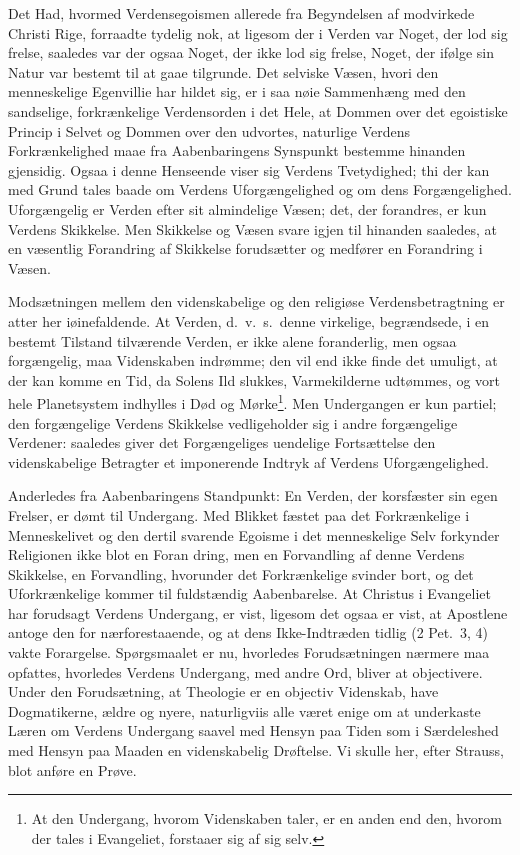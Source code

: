 \documentclass[12pt]{book}
\begin{document}
Det Had, hvormed Verdensegoismen allerede fra Begyndelsen af
modvirkede Christi Rige, forraadte tydelig nok, at ligesom der i
Verden var Noget, der lod sig frelse, saaledes var der ogsaa Noget,
der ikke lod sig frelse, Noget, der ifølge sin Natur var bestemt til
at
gaae tilgrunde. Det selviske Væsen, hvori den menneskelige
Egenvillie har hildet sig, er i saa nøie Sammenhæng med den
sandselige, forkrænkelige Verdensorden i det Hele, at Dommen over
det egoistiske Princip i Selvet og Dommen over den udvortes,
naturlige Verdens Forkrænkelighed maae fra Aabenbaringens Synspunkt
bestemme hinanden gjensidig. Ogsaa i denne Henseende viser sig
Verdens Tvetydighed; thi der kan med Grund tales baade om Verdens
Uforgængelighed og om dens Forgængelighed. Uforgængelig er Verden
efter sit almindelige Væsen; det, der forandres, er kun Verdens
Skikkelse. Men Skikkelse og Væsen svare igjen til hinanden saaledes,
at en væsentlig Forandring af Skikkelse forudsætter og medfører en
Forandring i Væsen.

Modsætningen mellem den videnskabelige og den religiøse
Verdensbetragtning er atter her iøinefaldende. At Verden,
d.\ v.\ s.\ denne virkelige, begrændsede, i en bestemt Tilstand
tilværende Verden, er ikke alene foranderlig, men ogsaa forgængelig,
maa Videnskaben indrømme; den vil end ikke finde det umuligt, at der
kan komme en Tid, da Solens Ild slukkes, Varmekilderne udtømmes, og
vort hele Planetsystem indhylles i Død og Mørke\footnote{At den
Undergang, hvorom Videnskaben taler, er en anden end den, hvorom der
tales i Evangeliet, forstaaer sig af sig selv.}. Men Undergangen er
kun partiel; den forgængelige Verdens Skikkelse vedligeholder sig i
andre forgængelige Verdener: saaledes giver det Forgængeliges
uendelige Fortsættelse den videnskabelige Betragter et imponerende
Indtryk af Verdens Uforgængelighed.

Anderledes fra Aabenbaringens Standpunkt: En Verden, der korsfæster
sin egen Frelser, er dømt til Undergang. Med Blikket fæstet paa det
Forkrænkelige i Menneskelivet og den dertil svarende Egoisme i det
menneskelige Selv forkynder Religionen ikke blot en Foran\-
dring, men en Forvandling af denne Verdens Skikkelse, en
Forvandling, hvorunder det Forkrænkelige svinder bort, og det
Uforkrænkelige kommer til fuldstændig Aabenbarelse. At Christus i
Evangeliet har forudsagt Verdens Undergang, er vist, ligesom det
ogsaa er vist, at Apostlene antoge den for nærforestaaende, og at
dens Ikke-Indtræden tidlig (2 Pet.\ 3, 4) vakte Forargelse.
Spørgsmaalet er nu, hvorledes Forudsætningen nærmere maa opfattes,
hvorledes Verdens Undergang, med andre Ord, bliver at objectivere.
Under den Forudsætning, at Theologie er en objectiv Videnskab, have
Dogmatikerne, ældre og nyere, naturligviis alle været enige om at
underkaste Læren om Verdens Undergang saavel med Hensyn paa Tiden
som i Særdeleshed med Hensyn paa Maaden en videnskabelig Drøftelse.
Vi skulle her, efter Strauss, blot anføre en Prøve.
\end{document}
